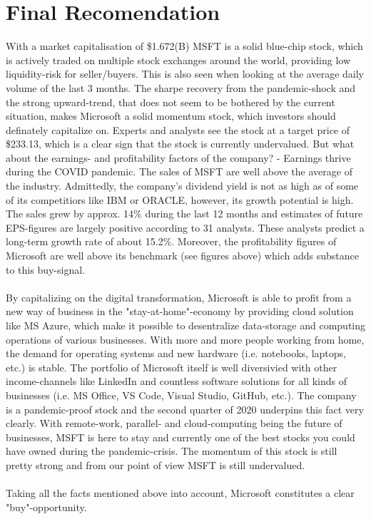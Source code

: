 \documentclass[]{article}
\begin{document}
\section{Final Recomendation}
With a market capitalisation of \$1.672(B) MSFT is a solid blue-chip stock, which is actively traded on multiple stock exchanges around the world, providing low liquidity-risk for seller/buyers. This is also seen when looking at the average daily volume of the last 3 months. The sharpe recovery from the pandemic-shock and the strong upward-trend, that does not seem to be bothered by the current situation, makes Microsoft a solid momentum stock, which investors should definately capitalize on. Experts and analysts see the stock at a target price of \$233.13, which is a clear sign that the stock is currently undervalued. But what about the earnings- and profitability factors of the company? - Earnings thrive during the COVID pandemic. The sales of MSFT are well above the average of the industry. Admittedly, the company's dividend yield is not as high as of some of its competitiors like IBM or ORACLE, however, its growth potential is high. The sales grew by approx. 14\% during the last 12 months and estimates of future EPS-figures are largely positive according to 31 analysts. These analysts predict a long-term growth rate of about 15.2\%. Moreover, the profitability figures of Microsoft  are well above its benchmark (see figures above) which adds substance to this buy-signal.\\\\
By capitalizing on the digital transformation, Microsoft is able to profit from a new way of business in the "stay-at-home"-economy by providing cloud solution like MS Azure, which make it possible to desentralize data-storage and computing operations of various businesses. With more and more people working from home, the demand for operating systems and new hardware (i.e. notebooks, laptops, etc.) is stable. The portfolio of Microsoft itself is well diversivied with other income-channels like LinkedIn and countless software solutions for all kinds of businesses (i.e. MS Office, VS Code, Visual Studio, GitHub, etc.). The company is a pandemic-proof stock and the second quarter of 2020 underpins this fact very clearly. With remote-work, parallel- and cloud-computing being the future of businesses, MSFT is here to stay and currently one of the best stocks you could have owned during the pandemic-crisis. The momentum of this stock is still pretty strong and from our point of view MSFT is still undervalued.\\\\
Taking all the facts mentioned above into account, Microsoft constitutes a clear "buy"-opportunity.




\end{document}
